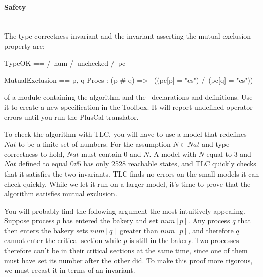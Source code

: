 \documentclass[fleqn,leqno]{article}
\begin{document}
\paragraph{Safety}\mbox{}\\
The type-correctness invariant and the invariant asserting the mutual
exclusion property are:
\begin{display}
\begin{notla}
TypeOK == /\ num 
          /\ unchecked 
          /\ pc 
          
MutualExclusion == 
    \A p, q \in Procs : (p # q) => ~((pc[p] = "cs") /\ (pc[q] = "cs"))
\end{notla}
\begin{tlatex}
%
\@pvspace{8.0pt}%
%
\end{tlatex}
\end{display}
 of a
module containing the algorithm and the \tlaplus\ declarations and
definitions.  Use it to create a new specification in the Toolbox.  It
will report undefined operator errors until you run the PlusCal
translator.

To check the algorithm with TLC, you will have to use a model that
redefines $Nat$ to be a finite set of numbers.  For the assumption $N
\in Nat$ and type correctness to hold, $Nat$ must contain 0 and $N$.
A model with $N$ equal to 3 and $Nat$ defined to equal $0\dd 5$ has
only 2528 reachable states, and TLC quickly checks that it satisfies
the two invariants.  TLC finds no errors on the small models it can
check quickly.  While we let it run on a larger model, it's time to
prove that the algorithm satisfies mutual exclusion.

You will probably find the following argument the most intuitively
appealing.  Suppose process $p$ has entered the bakery and set
$num[p]$.  Any process $q$ that then enters the bakery sets $num[q]$
greater than $num[p]$, and therefore $q$ cannot enter the critical
section while $p$ is still in the bakery.  Two processes therefore
can't be in their critical sections at the same time, since one of
them must have set its number after the other did.  To make this proof
more rigorous, we must recast it in terms of an invariant.
\end{document}
